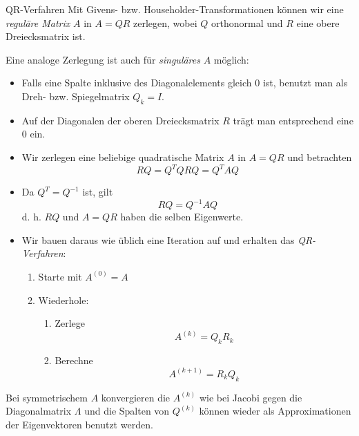 \begin{defi}{QR-Verfahren}
    Mit Givens- bzw. Householder-Transformationen können wir eine \emph{reguläre Matrix} $A$ in $A = QR$ zerlegen, wobei $Q$ orthonormal und $R$ eine obere Dreiecksmatrix ist.

    Eine analoge Zerlegung ist auch für \emph{singuläres} $A$ möglich:
    \begin{itemize}
        \item Falls eine Spalte inklusive des Diagonalelements gleich $0$ ist, benutzt man als Dreh- bzw. Spiegelmatrix $Q_k = I$.
        \item Auf der Diagonalen der oberen Dreiecksmatrix $R$ trägt man entsprechend eine $0$ ein.
        \item Wir zerlegen eine beliebige quadratische Matrix $A$ in $A = QR$ und betrachten
              \[
                  RQ = Q^T Q R Q = Q^T A Q
              \]
        \item Da $Q^T = Q^{-1}$ ist, gilt
              \[
                  RQ = Q^{-1} A Q
              \]
              d. h. $RQ$ und $A = QR$ haben die selben Eigenwerte.
        \item Wir bauen daraus wie üblich eine Iteration auf und erhalten das \emph{QR-Verfahren}:
              \begin{enumerate}
                  \item Starte mit $A^{(0)} = A$
                  \item Wiederhole:
                        \begin{enumerate}
                            \item Zerlege
                                  \[
                                      A^{(k)} = Q_k R_k
                                  \]
                            \item Berechne
                                  \[
                                      A^{(k+1)} = R_k Q_k
                                  \]
                        \end{enumerate}
              \end{enumerate}
    \end{itemize}

    Bei symmetrischem $A$ konvergieren die $A^{(k)}$ wie bei Jacobi gegen die Diagonalmatrix $\Lambda$ und die Spalten von $Q^{(k)}$ können wieder als Approximationen der Eigenvektoren benutzt werden.
\end{defi}

